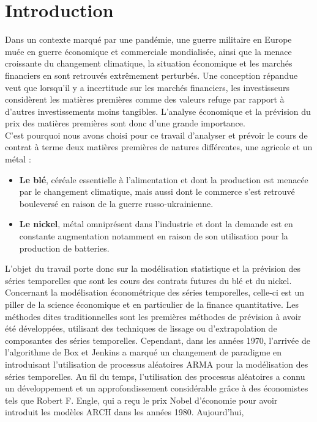 \section*{Introduction}
Dans un contexte marqué par une pandémie, une guerre militaire en Europe muée en guerre économique et commerciale mondialisée, ainsi que la menace croissante du 
changement climatique, la situation économique et les marchés financiers en sont retrouvés extrêmement perturbés. Une conception répandue
veut que lorsqu'il y a incertitude sur les marchés financiers, les investisseurs considèrent les matières premières comme des valeurs refuge par rapport à d'autres 
investissements moins tangibles. L'analyse économique et la prévision du prix des matières premières sont donc d'une grande importance.\\[11pt] 
C'est pourquoi nous avons choisi pour ce travail d'analyser et prévoir le cours de contrat à terme deux matières premières de natures différentes, une agricole et un métal :
\begin{itemize}
    \item \textbf{Le blé}, céréale essentielle à l'alimentation et dont la production est menacée par le changement climatique, mais aussi dont le commerce s'est retrouvé bouleversé en raison de la guerre russo-ukrainienne.
    \item \textbf{Le nickel}, métal omniprésent dans l'industrie et dont la demande est en constante augmentation notamment en raison de son utilisation pour la production 
    de batteries.
\end{itemize}
L'objet du travail porte donc sur la modélisation statistique et la prévision des séries temporelles que sont les cours des contrats futures du blé et du nickel. Concernant
la modélisation économétrique des séries temporelles, celle-ci est un piller de la science économique et en particulier de la finance quantitative. Les méthodes dites 
traditionnelles sont les premières méthodes de prévision à avoir été développées, utilisant des techniques de lissage ou d'extrapolation de composantes des séries 
temporelles. Cependant, dans les années 1970, l'arrivée de l'algorithme de Box et Jenkins a marqué un changement de paradigme en introduisant l'utilisation de processus 
aléatoires ARMA pour la modélisation des séries temporelles. Au fil du temps, l'utilisation des processus aléatoires a connu un développement et un approfondissement 
considérable grâce à des économistes tels que Robert F. Engle, qui a reçu le prix Nobel d'économie pour avoir introduit les modèles ARCH dans les années 1980. Aujourd'hui, 

